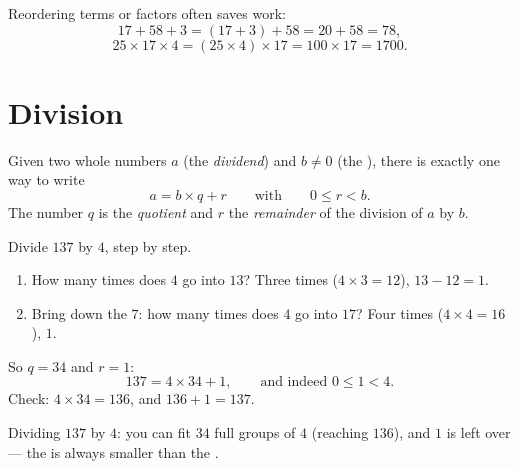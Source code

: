 \begin{example}\label{ex:g6:wholes:smart}
Reordering terms or factors often saves work:
\[
17 + 58 + 3 = (17 + 3) + 58 = 20 + 58 = 78 ,
\]
\[
25 \times 17 \times 4 = (25 \times 4) \times 17 = 100 \times 17 = 1700 .
\]
\end{example}

\section{Division}

\begin{theorem}\label{thm:g6:wholes:division}
Given two whole numbers $a$ (the \emph{dividend}) and $b \neq 0$ (the
\emph{}), there is exactly one way to write
\[
a = b \times q + r
\qquad\text{with}\qquad
0 \leq r < b .
\]
The number $q$ is the \emph{quotient} and $r$ the
\emph{remainder} of the division of $a$ by $b$.
\end{theorem}
\admitted

\begin{example}\label{ex:g6:wholes:division}
Divide $137$ by $4$, step by step.
\begin{enumerate}
  \item How many times does $4$ go into $13$? Three times
        ($4 \times 3 = 12$),  $13 - 12 = 1$.
  \item Bring down the $7$: how many times does $4$ go into $17$?
        Four times ($4 \times 4 = 16$),  $1$.
\end{enumerate}
So $q = 34$ and $r = 1$:
\[
137 = 4 \times 34 + 1, \qquad\text{and indeed } 0 \leq 1 < 4 .
\]
Check: $4 \times 34 = 136$, and $136 + 1 = 137$.
\end{example}

\begin{omfigure}

{\small Dividing $137$ by $4$: you can fit $34$ full groups of $4$
(reaching $136$), and $1$ is left over --- the  is always
smaller than the .}
\end{omfigure}

